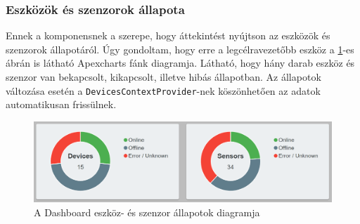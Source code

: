 \subsubsection{Eszközök és szenzorok állapota}
Ennek a komponensnek a szerepe, hogy áttekintést nyújtson az eszközök és szenzorok állapotáról.
Úgy gondoltam, hogy erre a legcélravezetőbb eszköz a \ref{fig:dashboard-donut}-es ábrán is látható Apexcharts fánk diagramja.
Látható, hogy hány darab eszköz és szenzor van bekapcsolt, kikapcsolt, illetve hibás állapotban.
Az állapotok változása esetén a \verb+DevicesContextProvider+-nek köszönhetően az adatok automatikusan frissülnek.
\begin{figure}[!ht]
    \centering
    \includegraphics[width=150mm, keepaspectratio]{figures/dashboard-donut-devices.png}
    \caption{A Dashboard eszköz- és szenzor állapotok diagramja}
    \label{fig:dashboard-donut}
\end{figure}
